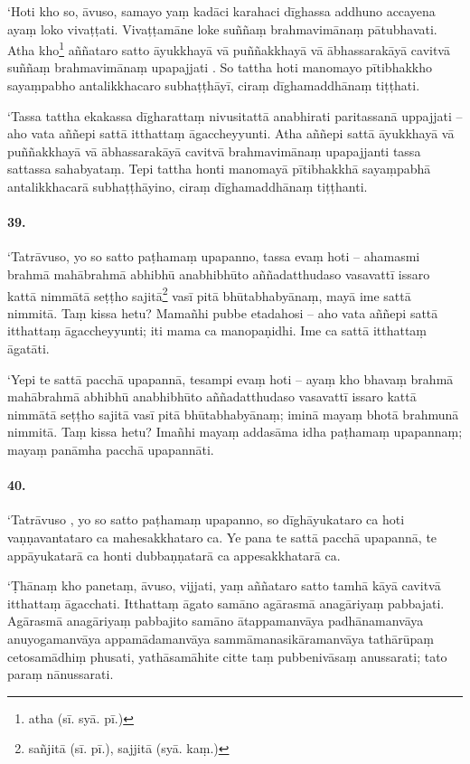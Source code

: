 ‘Hoti kho so, āvuso, samayo yaṃ kadāci karahaci dīghassa addhuno accayena ayaṃ loko vivaṭṭati. Vivaṭṭamāne loke suññaṃ brahmavimānaṃ pātubhavati. Atha kho\footnote{atha (sī. syā. pī.)} aññataro satto āyukkhayā vā puññakkhayā vā ābhassarakāyā cavitvā suññaṃ brahmavimānaṃ upapajjati . So tattha hoti manomayo pītibhakkho sayaṃpabho antalikkhacaro subhaṭṭhāyī, ciraṃ dīghamaddhānaṃ tiṭṭhati.

‘Tassa tattha ekakassa dīgharattaṃ nivusitattā anabhirati paritassanā uppajjati – aho vata aññepi sattā itthattaṃ āgaccheyyunti. Atha aññepi sattā āyukkhayā vā puññakkhayā vā ābhassarakāyā cavitvā brahmavimānaṃ upapajjanti tassa sattassa sahabyataṃ. Tepi tattha honti manomayā pītibhakkhā sayaṃpabhā antalikkhacarā subhaṭṭhāyino, ciraṃ dīghamaddhānaṃ tiṭṭhanti.

\paragraph{39.} ‘Tatrāvuso, yo so satto paṭhamaṃ upapanno, tassa evaṃ hoti – ahamasmi brahmā mahābrahmā abhibhū anabhibhūto aññadatthudaso vasavattī issaro kattā nimmātā seṭṭho sajitā\footnote{sañjitā (sī. pī.), sajjitā (syā. kaṃ.)} vasī pitā bhūtabhabyānaṃ, mayā ime sattā nimmitā. Taṃ kissa hetu? Mamañhi pubbe etadahosi – aho vata aññepi sattā itthattaṃ āgaccheyyunti; iti mama ca manopaṇidhi. Ime ca sattā itthattaṃ āgatāti.

‘Yepi te sattā pacchā upapannā, tesampi evaṃ hoti – ayaṃ kho bhavaṃ brahmā mahābrahmā abhibhū anabhibhūto aññadatthudaso vasavattī issaro kattā nimmātā seṭṭho sajitā vasī pitā bhūtabhabyānaṃ; iminā mayaṃ bhotā brahmunā nimmitā. Taṃ kissa hetu? Imañhi mayaṃ addasāma idha paṭhamaṃ upapannaṃ; mayaṃ panāmha pacchā upapannāti.

\paragraph{40.} ‘Tatrāvuso , yo so satto paṭhamaṃ upapanno, so dīghāyukataro ca hoti vaṇṇavantataro ca mahesakkhataro ca. Ye pana te sattā pacchā upapannā, te appāyukatarā ca honti dubbaṇṇatarā ca appesakkhatarā ca.

‘Ṭhānaṃ kho panetaṃ, āvuso, vijjati, yaṃ aññataro satto tamhā kāyā cavitvā itthattaṃ āgacchati. Itthattaṃ āgato samāno agārasmā anagāriyaṃ pabbajati. Agārasmā anagāriyaṃ pabbajito samāno ātappamanvāya padhānamanvāya anuyogamanvāya appamādamanvāya sammāmanasikāramanvāya tathārūpaṃ cetosamādhiṃ phusati, yathāsamāhite citte taṃ pubbenivāsaṃ anussarati; tato paraṃ nānussarati.

